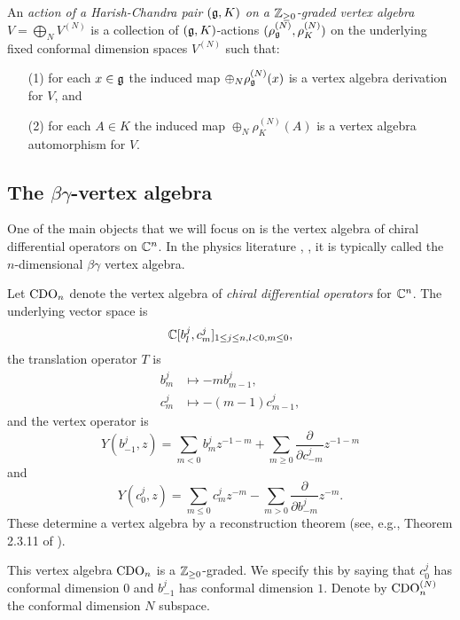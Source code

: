 \begin{dfn}\label{graction} 
An \emph{action of a Harish-Chandra pair $(\mathfrak g,K)$ on a $\mathbb Z_{\geq 0}$-graded vertex algebra $V = \bigoplus_{N} V^{(N)}$} 
is a collection of $(\mathfrak g,K)$-actions $(\rho^{(N)}_{\mathfrak g}, \rho^{(N)}_{K})$ on the underlying fixed conformal dimension spaces $V^{(N)}$ such that:
\begin{itemize}
\item[(1)] for each $x \in \mathfrak g$ the induced map $\oplus_N \rho^{(N)}_\mathfrak g(x)$ is a vertex algebra derivation for $V$, and
\item[(2)] for each $A \in K$ the induced map $\oplus_{N} \rho^{(N)}_K(A)$ is a vertex algebra automorphism for $V$.
\end{itemize}
\end{dfn}


\subsection{The $\beta\gamma$-vertex algebra}

One of the main objects that we will focus on is the vertex algebra of
chiral differential operators on $\mathbb C^n$. In the physics literature
\cite{WittenCDO}, \cite{Nek}, \cite{polchinski} it is typically called the $n$-dimensional $\beta\gamma$ vertex algebra. 

\begin{dfn}
Let ${\rm CDO}_n$ denote the vertex algebra of {\em chiral differential operators} for $\mathbb C^n$. The underlying vector space is
\[
\mathbb C [b_l^j,c_m^j]_{1 \leq j \leq n, l < 0, m \leq 0},
\]
the translation operator $T$ is
\begin{align*} 
 b_m^j &\mapsto -m b_{m-1}^j, \\
 c_m^j &\mapsto -(m-1) c_{m-1}^j,
\end{align*}
and the vertex operator is
\[
Y(b^j_{-1},z) = \sum_{m < 0} b_m^j z^{-1-m} + \sum_{m \ge 0} \frac{\partial}{\partial c_{-m}^j} z^{-1-m} 
\]
and 
\[
Y(c_{0}^j,z) = \sum_{m \le 0} c^j_m z^{-m} - \sum_{m > 0}  \frac{\partial}{\partial b_{-m}^j} z^{-m}.
\]
These determine a vertex algebra by a reconstruction theorem (see, e.g., Theorem 2.3.11 of \cite{BZF}).
\end{dfn}

This vertex algebra ${\rm CDO}_n$ is a $\mathbb Z_{\geq 0}$-graded. We specify this by
saying that $c_0^j$ has conformal dimension $0$ and $b_{-1}^j$ has
conformal dimension $1$. Denote by ${\rm CDO}_n^{(N)}$ the conformal dimension
$N$ subspace. 

